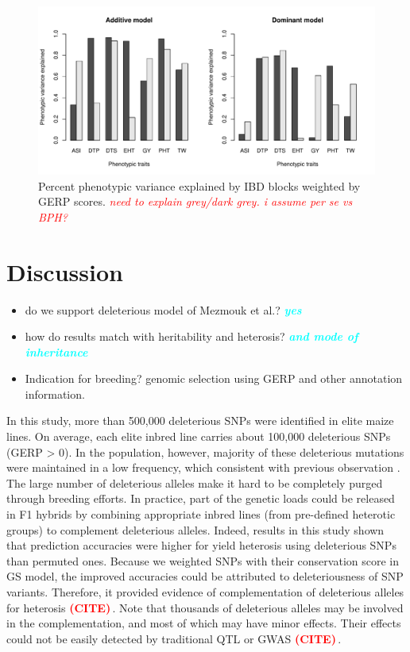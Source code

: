 \documentclass[9pt,twocolumn,twoside]{gsajnl}
\newcommand{\yang}[1]{\textcolor{cyan}{\emph{\bf  #1}} }
\newcommand{\citex}{\textcolor{red}{\bf (CITE)\,}}
\newcommand{\jri}[1]{\textcolor{red}{ \emph{ #1}} }
\begin{document}
\begin{figure}[htbp]
\centering
\includegraphics[width=\linewidth]{Figure_h2.pdf}
\caption{Percent phenotypic variance explained by IBD blocks weighted by GERP scores. \jri{need to explain grey/dark grey. i assume per se vs BPH?}}
\label{fig:h2}
\end{figure}


\section*{Discussion}

\begin{itemize}
  \item do we support deleterious model of Mezmouk et al.? \yang{yes}
  \item how do results match with heritability and heterosis? \yang{and mode of inheritance}
  \item Indication for breeding? genomic selection using GERP and other annotation information. 
\end{itemize}


In this study, more than 500,000 deleterious SNPs were identified in elite maize lines. On average, each elite inbred line carries about 100,000 deleterious SNPs (GERP > 0). In the population, however, majority of these deleterious mutations were maintained in a low frequency, which consistent with previous observation \citep{rodgers2015recombination}. The large number of deleterious alleles make it hard to be completely purged through breeding efforts. In practice, part of the genetic loads could be released in F1 hybrids by combining appropriate inbred lines (from pre-defined heterotic groups) to complement deleterious alleles. Indeed, results in this study shown that prediction accuracies were higher for yield heterosis using deleterious SNPs than permuted ones. Because we weighted SNPs with their conservation score in GS model, the improved accuracies could be attributed to deleteriousness of SNP variants. Therefore, it provided evidence of complementation of deleterious alleles for heterosis \citex{}. Note that thousands of deleterious alleles may be involved in the complementation, and most of which may have minor effects. Their effects could not be easily detected by traditional QTL or GWAS \citex{}.
\end{document}
